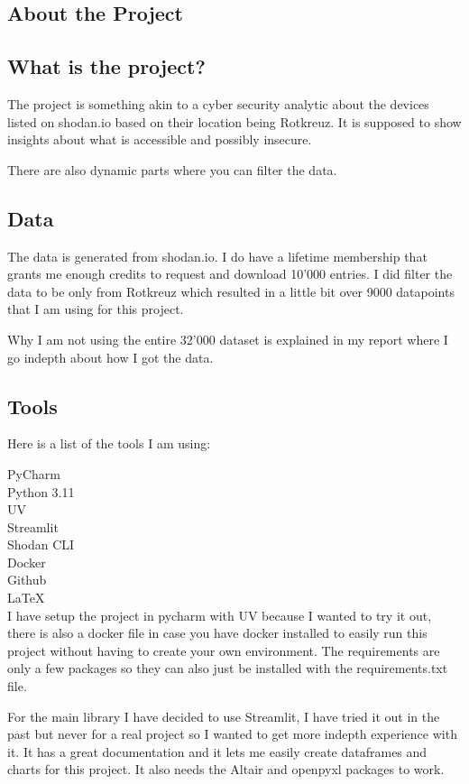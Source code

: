 \documentclass[11pt,a4paper]{article}
\begin{document}
\begin{about}
\section{About the Project}
\subsection{What is the project?}
The project is something akin to a cyber security analytic about the devices listed on shodan.io based on their location
being Rotkreuz. It is supposed to show insights about what is accessible and possibly insecure.

There are also dynamic parts where you can filter the data.
\subsection{Data}
The data is generated from shodan.io. I do have a lifetime membership that grants me enough credits to request and
download 10'000 entries. I did filter the data to be only from Rotkreuz which resulted in a little bit over 9000
datapoints that I am using for this project.

Why I am not using the entire 32'000 dataset is explained in my report where I go indepth about how I got the data.

\subsection{Tools}
Here is a list of the tools I am using:

PyCharm \\
Python 3.11 \\
UV \\
Streamlit \\
Shodan CLI \\
Docker \\
Github \\
LaTeX \\

I have setup the project in pycharm with UV because I wanted to try it out, there is also a docker file in case you have
docker installed to easily run this project without having to create your own environment. The requirements are only a few
packages so they can also just be installed with the requirements.txt file.

For the main library I have decided to use Streamlit, I have tried it out in the past but never for a real project so I
wanted to get more indepth experience with it. It has a great documentation and it lets me easily create dataframes and
charts for this project. It also needs the Altair and openpyxl packages to work.


\end{about}
\end{document}
